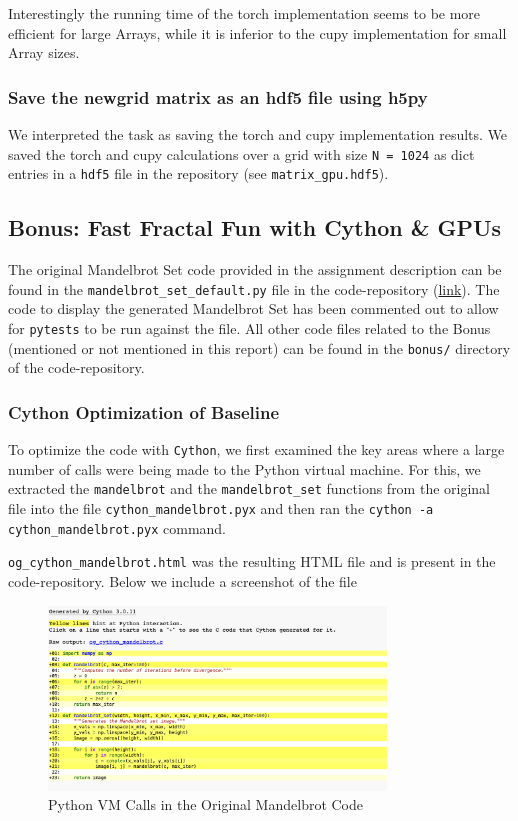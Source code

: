 \documentclass[a4paper,12pt]{article}
\begin{document}
 Interestingly the running time of the torch implementation seems to be more efficient for large Arrays, while it is
 inferior to the cupy implementation for small Array sizes.

\subsubsection{Save the newgrid matrix as an hdf5 file using h5py }
We interpreted the task as saving the torch and cupy implementation results. We saved the torch and cupy calculations over a grid with size \verb|N = 1024|
as dict entries in a \verb|hdf5| file in the repository (see \verb|matrix_gpu.hdf5|).

\subsection{Bonus: Fast Fractal Fun with Cython \& GPUs}
The original Mandelbrot Set code provided in the assignment description can be found in the \verb|mandelbrot_set_default.py| file in the code-repository (\href{https://github.com/paulmyr/DD2358-HPC25/blob/master/03_compgpu/bonus/mandelbrot_set_default.py}{link}). The code to display the generated Mandelbrot Set has been commented out to allow for \verb|pytests| to be run against the file. All other code files related to the Bonus (mentioned or not mentioned in this report) can be found in the \verb|bonus/| directory of the code-repository.

\subsubsection{Cython Optimization of Baseline}
To optimize the code with \verb|Cython|, we first examined the key areas where a large number of calls were being made to the Python virtual machine. For this, we extracted the \verb|mandelbrot| and the \verb|mandelbrot_set| functions from the original file into the file \verb|cython_mandelbrot.pyx| and then ran the \verb|cython -a cython_mandelbrot.pyx| command. 

\verb|og_cython_mandelbrot.html| was the resulting HTML file and is present in the code-repository. Below we include a screenshot of the file

\begin{figure}[H]
  \centering
  \includegraphics[width=0.8\textwidth]{images/og_mandelbrot_cython.png}
  \caption{Python VM Calls in the Original Mandelbrot Code}
\end{figure}
\end{document}
